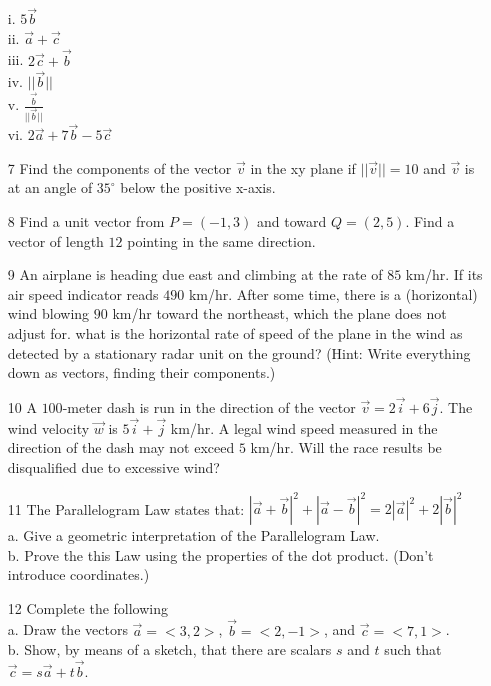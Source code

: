 \documentclass[a4paper]{article}
\begin{document}
\begin{itemize}
 i. $5\overrightarrow{b}$ \\
 ii. $\overrightarrow{a} + \overrightarrow{c}$ \\
 iii. $2\overrightarrow{c} + \overrightarrow{b}$ \\
 iv. $||\overrightarrow{b}||$ \\
 v. $\frac{\overrightarrow{b}}{||\overrightarrow{b}||}$ \\
 vi. $2\overrightarrow{a} + 7\overrightarrow{b} − 5\overrightarrow{c}$
 \item[7] Find the components of the vector $\overrightarrow{v}$ in the xy plane if $||\overrightarrow{v}|| = 10$ and $\overrightarrow{v}$ is at an angle of $35^{\circ}$ below the positive x-axis.
 \item[8] Find a unit vector from $P = (−1,3)$ and toward $Q = (2,5)$. Find a vector of length $12$ pointing in the same direction.
 \item[9] An airplane is heading due east and climbing at the rate of $85$ km/hr. If its air speed indicator reads $490$ km/hr. After some time, there is a (horizontal) wind blowing $90$ km/hr toward the northeast, which the plane does not adjust for. what is the horizontal rate of speed of the plane in the wind as detected by a stationary radar unit on the ground? (Hint: Write everything down as vectors, finding their components.)
 \item[10] A $100$-meter dash is run in the direction of the vector $\overrightarrow{v} = 2\overrightarrow{i} + 6\overrightarrow{j}$. The wind velocity $\overrightarrow{w}$ is $5\overrightarrow{i} + \overrightarrow{j}$ km/hr. A legal wind speed measured in the direction of the dash may not exceed $5$ km/hr. Will the race results be disqualified due to excessive wind?
 \item[11] The Parallelogram Law states that: $|\overrightarrow{a} + \overrightarrow{b}|^{2} + |\overrightarrow{a} − \overrightarrow{b}|^{2} = 2|\overrightarrow{a}|^{2} + 2|\overrightarrow{b}|^{2}$ \\
 a. Give a geometric interpretation of the Parallelogram Law. \\
 b. Prove the this Law using the properties of the dot product. (Don’t introduce coordinates.)
 \item[12] Complete the following \\
 a. Draw the vectors $\overrightarrow{a} = <3, 2>$, $\overrightarrow{b} = <2, −1>$, and $\overrightarrow{c} = <7, 1>$. \\
 b. Show, by means of a sketch, that there are scalars $s$ and $t$ such that $\overrightarrow{c} = s\overrightarrow{a} + t\overrightarrow{b}$. \\

\end{itemize}
\end{document}
